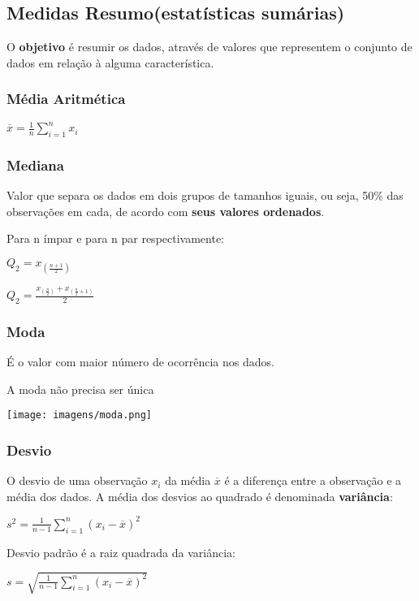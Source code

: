 \documentclass[a4paper, 12pt]{article}
\begin{document}
\subsection{Medidas Resumo(estatísticas sumárias)}
	O \textbf{objetivo} é resumir os dados, através de valores que representem o conjunto de dados em relação à alguma característica.
\subsubsection{Média Aritmética}
	\begin{center}
		\LARGE
		$\overline{x} = \frac{1}{n} \sum_{i = 1}^{n} x_{i}$
	\end{center}
\subsubsection{Mediana}
	Valor que separa os dados em dois grupos de tamanhos iguais, ou seja, 50\% das observações em cada, de acordo com \textbf{seus valores ordenados}.
	
	Para n ímpar e para n par respectivamente:
	\begin{center}
		\LARGE
		$
		Q_{2} = x_{(\frac{n+1}{2})}
		$
		
		$
		Q_{2} = \frac{x_{(\frac{n}{2})} + x_{(\frac{n}{2} + 1)}}{2}
		$
	\end{center}

\subsubsection{Moda}
	É o valor com maior número de ocorrência nos dados.
	
	A moda não precisa ser única

	\begin{center}
		\texttt{[image: imagens/moda.png]}
	\end{center}
\subsubsection{Desvio}
	O desvio de uma observação $x_{i}$ da média $\overline{x}$ é a diferença entre a observação e a média dos dados.
	A média dos desvios ao quadrado é denominada \textbf{variância}:
	\begin{center}
		\LARGE
		$
		s^{2} = \frac{1}{n-1}\sum_{i = 1}^{n}(x_{i} - \overline{x})^{2}
		$
	\end{center}
	Desvio padrão é a raiz quadrada da variância:
	\begin{center}
		\LARGE
		$
		s = \sqrt{\frac{1}{n-1}\sum_{i = 1}^{n}(x_{i} - \overline{x})^{2}}
		$
	\end{center}
	
\end{document}
